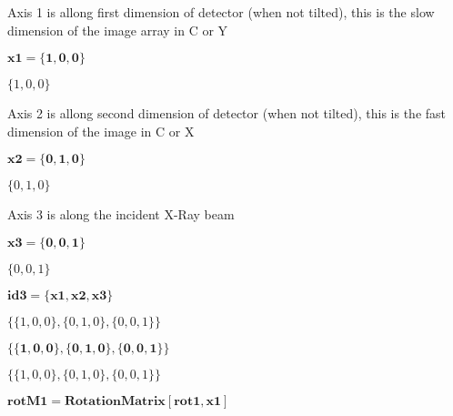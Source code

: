 \documentclass{article}
\begin{document}
Axis 1 is allong first dimension of detector (when not tilted), this is the slow dimension of the image array in C or Y

\begin{doublespace}
\noindent\(\pmb{\text{x1}=\{1,0,0\}}\)
\end{doublespace}

\begin{doublespace}
\noindent\(\{1,0,0\}\)
\end{doublespace}

 Axis 2 is allong second dimension of detector (when not tilted), this is the fast dimension of the image in C or X

\begin{doublespace}
\noindent\(\pmb{\text{x2}=\{0,1,0\}}\)
\end{doublespace}

\begin{doublespace}
\noindent\(\{0,1,0\}\)
\end{doublespace}

Axis 3 is along the incident X-Ray beam

\begin{doublespace}
\noindent\(\pmb{\text{x3}=\{0,0,1\}}\)
\end{doublespace}

\begin{doublespace}
\noindent\(\{0,0,1\}\)
\end{doublespace}

\begin{doublespace}
\noindent\(\pmb{\text{id3}=\{\text{x1},\text{x2},\text{x3}\}}\)
\end{doublespace}

\begin{doublespace}
\noindent\(\{\{1,0,0\},\{0,1,0\},\{0,0,1\}\}\)
\end{doublespace}

\begin{doublespace}
\noindent\(\pmb{\{\{1,0,0\},\{0,1,0\},\{0,0,1\}\}}\)
\end{doublespace}

\begin{doublespace}
\noindent\(\{\{1,0,0\},\{0,1,0\},\{0,0,1\}\}\)
\end{doublespace}

\begin{doublespace}
\noindent\(\pmb{\text{rotM1}=\text{RotationMatrix}[\text{rot1},\text{x1}]}\)
\end{doublespace}
\end{document}
